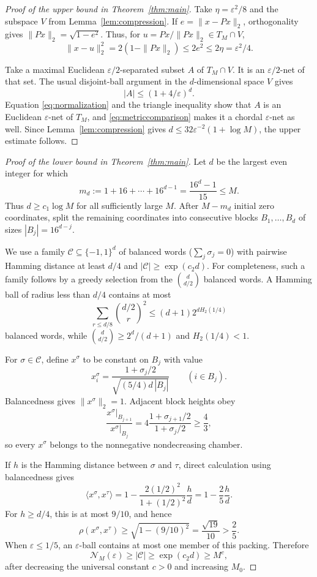 \documentclass[11pt]{article}
\newcommand{\cN}{\mathcal N}
\begin{document}
\begin{proof}[Proof of the upper bound in Theorem~\ref{thm:main}]
Take $\eta=\varepsilon^2/8$ and the subspace $V$ from
Lemma~\ref{lem:compression}.  If $e=\|x-Px\|_2$, orthogonality gives
$\|Px\|_2=\sqrt{1-e^2}$.  Thus, for
$u=Px/\|Px\|_2\in T_M\cap V$,
\begin{equation}\label{eq:normalization}
 \|x-u\|_2^2
 =2(1-\|Px\|_2)
 \leq2e^2\leq2\eta=\varepsilon^2/4.
\end{equation}

Take a maximal Euclidean $\varepsilon/2$-separated subset $A$ of
$T_M\cap V$.  It is an $\varepsilon/2$-net of that set.  The usual disjoint-ball
argument in the $d$-dimensional space $V$ gives
\[
 |A|\leq(1+4/\varepsilon)^d.
\]
Equation \eqref{eq:normalization} and the triangle inequality show that $A$ is
an Euclidean $\varepsilon$-net of $T_M$, and
\eqref{eq:metriccomparison} makes it a chordal $\varepsilon$-net as well.
Since Lemma~\ref{lem:compression} gives
$d\leq32\varepsilon^{-2}(1+\log M)$, the upper estimate follows.
\end{proof}

\begin{proof}[Proof of the lower bound in Theorem~\ref{thm:main}]
Let $d$ be the largest even integer for which
\[
 m_d:=1+16+\cdots+16^{d-1}=\frac{16^d-1}{15}\leq M.
\]
Thus $d\geq c_1\log M$ for all sufficiently large $M$.  After $M-m_d$
initial zero coordinates, split the remaining coordinates into consecutive
blocks $B_1,\ldots,B_d$ of sizes
$|B_j|=16^{d-j}$.

We use a family $\mathcal C\subseteq\{-1,1\}^d$ of balanced words
($\sum_j\sigma_j=0$) with pairwise Hamming distance at least $d/4$ and
$|\mathcal C|\geq\exp(c_2d)$.  For completeness, such a family follows by a
greedy selection from the $\binom d{d/2}$ balanced words.  A Hamming ball of
radius less than $d/4$ contains at most
\[
 \sum_{r\leq d/8}\binom{d/2}{r}^2
 \leq(d+1)2^{dH_2(1/4)}
\]
balanced words, while
$\binom d{d/2}\geq2^d/(d+1)$ and $H_2(1/4)<1$.

For $\sigma\in\mathcal C$, define $x^\sigma$ to be constant on $B_j$ with
value
\begin{equation}\label{eq:packingvector}
 x^\sigma_i=
 \frac{1+\sigma_j/2}{\sqrt{(5/4)d\,|B_j|}}
 \qquad(i\in B_j).
\end{equation}
Balancedness gives $\|x^\sigma\|_2=1$.  Adjacent block heights obey
\[
 \frac{x^\sigma|_{B_{j+1}}}{x^\sigma|_{B_j}}
 =4\frac{1+\sigma_{j+1}/2}{1+\sigma_j/2}\geq\frac43,
\]
so every $x^\sigma$ belongs to the nonnegative nondecreasing chamber.

If $h$ is the Hamming distance between $\sigma$ and $\tau$, direct calculation
using balancedness gives
\[
 \langle x^\sigma,x^\tau\rangle
 =1-\frac{2(1/2)^2}{1+(1/2)^2}\frac hd
 =1-\frac25\frac hd.
\]
For $h\geq d/4$, this is at most $9/10$, and hence
\[
 \rho(x^\sigma,x^\tau)
 \geq\sqrt{1-(9/10)^2}=\frac{\sqrt{19}}{10}>\frac25.
\]
When $\varepsilon\leq1/5$, an $\varepsilon$-ball contains at most one member
of this packing.  Therefore
\[
 \cN_M(\varepsilon)\geq|\mathcal C|
 \geq\exp(c_2d)\geq M^c,
\]
after decreasing the universal constant $c>0$ and increasing $M_0$.
\end{proof}
\end{document}
